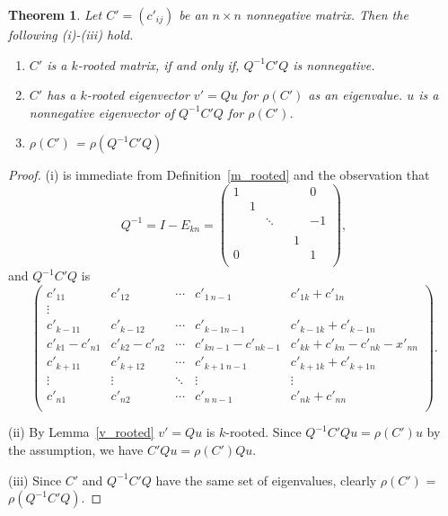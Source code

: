 \documentclass[12pt]{report}%
\theoremstyle{plain}
\newtheorem{thm}{Theorem}[chapter]
\theoremstyle{definition}
\begin{document}
\begin{thm}
Let $C'=(c'_{ij})$ be an $n\times n$ nonnegative matrix. Then the following (i)-(iii) hold.
    \begin{enumerate}
        \item[(i)]$C'$ is a $k$-rooted matrix, if and only if, $Q^{-1}C'Q$ is nonnegative.
        \item[(ii)]$C'$ has a $k$-rooted eigenvector $v'=Qu$ for $\rho(C')$ as an eigenvalue. $u$ is a nonnegative eigenvector of $Q^{-1}C'Q$ for $\rho(C')$.
        \item[(iii)] $\rho(C')$ = $\rho(Q^{-1}C'Q)$
    \end{enumerate}
\end{thm}

\begin{proof}
(i) is immediate from Definition~\ref{m_rooted} and the observation that
$$Q^{-1}=I-E_{kn}=\begin{pmatrix}
1 &  & & &  & 0 \\
 & 1 &  &      &  &  \\
 &  & \ddots & &  & -1 \\
 &  &        & &  &  \\
  &  & & & 1 &  \\
0 &  & & &  & 1 \\
\end{pmatrix},$$
and $Q^{-1}C'Q$ is
$$\begin{pmatrix}
c'_{11}     & c'_{12} & \cdots     & c'_{1\ n-1} & c'_{1k}+c'_{1n} \\
\vdots \\
c'_{k-11}     & c'_{k-1 2}           & \cdots     & c'_{k-1 n-1} & c'_{k-1k}+c'_{k-1n} \\
c'_{k1}-c'_{n1} & c'_{k2}-c'_{n2} &\cdots      &c'_{kn-1}-c'_{nk-1}& c'_{kk}+c'_{kn}-c'_{nk}-x'_{nn}\\
c'_{k+11}     & c'_{k+12}           & \cdots     & c'_{k+1\ n-1} & c'_{k+1k}+c'_{k+1n} \\
\vdots              & \vdots & \ddots              & \vdots & \vdots \\
c'_{n1}             & c'_{n2} & \cdots             & c'_{n\ n-1} & c'_{nk}+c'_{nn} \\
\end{pmatrix}.
$$



(ii)
By Lemma~\ref{v_rooted} $v'=Qu$ is $k$-rooted.
Since $Q^{-1}C'Qu=\rho(C')u$ by the assumption, we have
$C'Qu=\rho(C')Qu$.



(iii)
Since $C'$ and $Q^{-1}C'Q$ have the same set of eigenvalues, clearly $\rho(C')$ = $\rho(Q^{-1}C'Q)$.

\end{proof}
\end{document}
